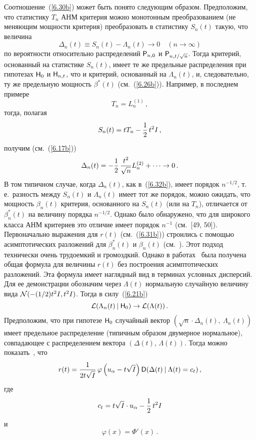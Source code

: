 \begin{multicols}{2}
Соотношение~(\ref{6.30b}) может быть понято следующим образом.
Предположим, что статистику $T_n$ АНМ критерия можно монотонным
преобразованием (не меняющим мощности критерия) преобразовать в
статистику $S_n(t)$ такую, что величина
\begin{equation}
\Delta_n(t) \equiv S_n(t) - \Lambda_n(t) \to 0\quad
(n\to\infty) \label{6.32b}
\end{equation}
по вероятности относительно распределений ${{\sf P}}_{n,0}$ и
${{\sf P}}_{n,t/\sqrt{n}}$. Тогда критерий, основанный на статистике
$S_n(t)$, имеет те же предельные распределения при гипотезах
${\sf H}_0$ и ${\sf H}_{n,t}$, что и критерий, основанный на
$\Lambda_n(t)$, и, следовательно, ту же предельную мощность
$\beta^*(t)$ (см.~(\ref{6.26b})). Например, в последнем примере
$$
T_n = L_n^{(1)}\,,
$$
тогда, полагая 
$$
S_n(t) =
tT_n - \displaystyle\frac{\displaystyle 1\mathstrut}{\displaystyle 2\mathstrut}\,t^2I\,,
$$
получим (см.~(\ref{6.17b}))
\begin{equation}
\Delta_n(t) = -\displaystyle\frac{\displaystyle 1\mathstrut}{\displaystyle 2\mathstrut}\,\displaystyle\frac{\displaystyle t^2\mathstrut}{\displaystyle \sqrt{n}\mathstrut}L_n^{(2)}+\cdots \to
0\,.
\label{6.33b}
\end{equation}
В том типичном случае, когда $\Delta_n(t)$, как
в~(\ref{6.32b}), имеет порядок $n^{-1/2}$, т.\,е.\ разность между
$S_n(t)$ и $\Lambda_n(t)$ имеет тот же порядок, можно ожидать, что
мощность $\beta_n(t)$ критерия, основанного на $S_n(t)$ (или на
$T_n$), отличается от $\beta_n^*(t)$ на величину порядка
$n^{-1/2}$. Однако было обнаружено, что для широкого класса АНМ
критериев это отличие имеет порядок $n^{-1}$ (см.~[49, 50]).
Первоначально выражения для $r(t)$ (см.~(\ref{6.31b})) строились с
помощью асимптотических разложений для $\beta_n^*(t)$ и
$\beta_n(t)$ (см.~\cite{26be, 51be}). Этот подход технически очень
трудоемкий и громоздкий. Однако в работах~\cite{19be, 25be} была получена
общая формула для величины $r(t)$ без построения асимптотических
разложений. Эта формула имеет наглядный вид в терминах условных
дисперсий. Для ее демонстрации обозначим через $\Lambda(t)$
нормальную случайную величину вида ${\cal N}(-(1/2)t^2I,t^2I)$.
Тогда в силу~(\ref{6.21b})
\begin{equation*}
{\cal L}(\Lambda_n(t)\:|\:{\sf H}_0)\to{\cal L}(\Lambda(t))\,.
\end{equation*}
Предположим, что при гипотезе ${\sf H}_0$ случайный вектор
$\left (\sqrt{n}\cdot \Delta_n(t),\:\Lambda_n(t)\right )
$ %
имеет предельное распределение (типичным образом двумерное нормальное),
совпадающее с распределением вектора
$\left (\Delta(t),\,\Lambda(t)\right)$.
Тогда можно показать~\cite{19be, 25be}, что
\begin{equation}
r(t) = \displaystyle\frac{\displaystyle 1\mathstrut}{\displaystyle 2t\sqrt{I}\mathstrut}\,\varphi\left (
u_{\alpha}-t\sqrt{I}\right )
{{\sf D}}(\Delta(t)\:|\:\Lambda(t) = c_t)\,,
\label{6.37b}
\end{equation}
где
$$
c_t= t\sqrt{I}\cdot u_{\alpha}-\displaystyle\frac{\displaystyle 1\mathstrut}{\displaystyle 2\mathstrut}\,t^2I
$$ 
и 
$$
\varphi(x)
=\Phi'(x)\,.
$$ 


\end{multicols}
